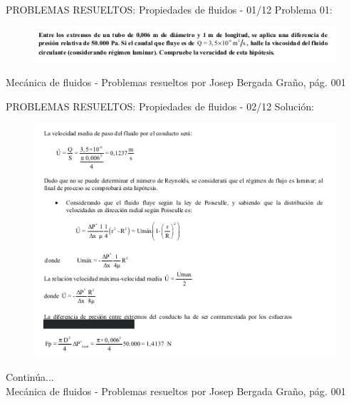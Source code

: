 
\begin{frame}{PROBLEMAS RESUELTOS: Propiedades de fluidos - 01/12}
\justifying
Problema 01:
\begin{figure}[H]
\centering
\includegraphics[scale=0.6]{Section_Files/S2-imagenes-Jhon/Book-ProbResuelts/P01-E01.png}
\end{figure}
{\tiny Mecánica de fluidos - Problemas resueltos por Josep Bergada Graño, pág. 001}
\end{frame}

\begin{frame}{PROBLEMAS RESUELTOS: Propiedades de fluidos - 02/12}
\justifying
Solución:
\begin{figure}[H]
\centering
\includegraphics[scale=0.4]{Section_Files/S2-imagenes-Jhon/Book-ProbResuelts/P01-E02.png}
\end{figure}
Continúa...\\
{\tiny Mecánica de fluidos - Problemas resueltos por Josep Bergada Graño, pág. 001}
\end{frame}

